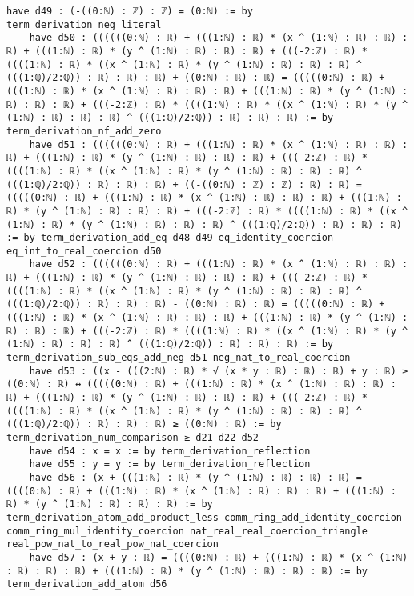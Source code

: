 \documentclass{article}
\begin{document}
\begin{tcolorbox}[colback=white!10, width=\linewidth]
\begin{lstlisting}[language=Lean4]
    have d49 : (-((0:ℕ) : ℤ) : ℤ) = (0:ℕ) := by term_derivation_neg_literal
    have d50 : ((((((0:ℕ) : ℝ) + (((1:ℕ) : ℝ) * (x ^ (1:ℕ) : ℝ) : ℝ) : ℝ) + (((1:ℕ) : ℝ) * (y ^ (1:ℕ) : ℝ) : ℝ) : ℝ) + (((-2:ℤ) : ℝ) * ((((1:ℕ) : ℝ) * ((x ^ (1:ℕ) : ℝ) * (y ^ (1:ℕ) : ℝ) : ℝ) : ℝ) ^ (((1:ℚ)/2:ℚ)) : ℝ) : ℝ) : ℝ) + ((0:ℕ) : ℝ) : ℝ) = (((((0:ℕ) : ℝ) + (((1:ℕ) : ℝ) * (x ^ (1:ℕ) : ℝ) : ℝ) : ℝ) + (((1:ℕ) : ℝ) * (y ^ (1:ℕ) : ℝ) : ℝ) : ℝ) + (((-2:ℤ) : ℝ) * ((((1:ℕ) : ℝ) * ((x ^ (1:ℕ) : ℝ) * (y ^ (1:ℕ) : ℝ) : ℝ) : ℝ) ^ (((1:ℚ)/2:ℚ)) : ℝ) : ℝ) : ℝ) := by term_derivation_nf_add_zero
    have d51 : ((((((0:ℕ) : ℝ) + (((1:ℕ) : ℝ) * (x ^ (1:ℕ) : ℝ) : ℝ) : ℝ) + (((1:ℕ) : ℝ) * (y ^ (1:ℕ) : ℝ) : ℝ) : ℝ) + (((-2:ℤ) : ℝ) * ((((1:ℕ) : ℝ) * ((x ^ (1:ℕ) : ℝ) * (y ^ (1:ℕ) : ℝ) : ℝ) : ℝ) ^ (((1:ℚ)/2:ℚ)) : ℝ) : ℝ) : ℝ) + ((-((0:ℕ) : ℤ) : ℤ) : ℝ) : ℝ) = (((((0:ℕ) : ℝ) + (((1:ℕ) : ℝ) * (x ^ (1:ℕ) : ℝ) : ℝ) : ℝ) + (((1:ℕ) : ℝ) * (y ^ (1:ℕ) : ℝ) : ℝ) : ℝ) + (((-2:ℤ) : ℝ) * ((((1:ℕ) : ℝ) * ((x ^ (1:ℕ) : ℝ) * (y ^ (1:ℕ) : ℝ) : ℝ) : ℝ) ^ (((1:ℚ)/2:ℚ)) : ℝ) : ℝ) : ℝ) := by term_derivation_add_eq d48 d49 eq_identity_coercion eq_int_to_real_coercion d50
    have d52 : ((((((0:ℕ) : ℝ) + (((1:ℕ) : ℝ) * (x ^ (1:ℕ) : ℝ) : ℝ) : ℝ) + (((1:ℕ) : ℝ) * (y ^ (1:ℕ) : ℝ) : ℝ) : ℝ) + (((-2:ℤ) : ℝ) * ((((1:ℕ) : ℝ) * ((x ^ (1:ℕ) : ℝ) * (y ^ (1:ℕ) : ℝ) : ℝ) : ℝ) ^ (((1:ℚ)/2:ℚ)) : ℝ) : ℝ) : ℝ) - ((0:ℕ) : ℝ) : ℝ) = (((((0:ℕ) : ℝ) + (((1:ℕ) : ℝ) * (x ^ (1:ℕ) : ℝ) : ℝ) : ℝ) + (((1:ℕ) : ℝ) * (y ^ (1:ℕ) : ℝ) : ℝ) : ℝ) + (((-2:ℤ) : ℝ) * ((((1:ℕ) : ℝ) * ((x ^ (1:ℕ) : ℝ) * (y ^ (1:ℕ) : ℝ) : ℝ) : ℝ) ^ (((1:ℚ)/2:ℚ)) : ℝ) : ℝ) : ℝ) := by term_derivation_sub_eqs_add_neg d51 neg_nat_to_real_coercion
    have d53 : ((x - (((2:ℕ) : ℝ) * √ (x * y : ℝ) : ℝ) : ℝ) + y : ℝ) ≥ ((0:ℕ) : ℝ) ↔ (((((0:ℕ) : ℝ) + (((1:ℕ) : ℝ) * (x ^ (1:ℕ) : ℝ) : ℝ) : ℝ) + (((1:ℕ) : ℝ) * (y ^ (1:ℕ) : ℝ) : ℝ) : ℝ) + (((-2:ℤ) : ℝ) * ((((1:ℕ) : ℝ) * ((x ^ (1:ℕ) : ℝ) * (y ^ (1:ℕ) : ℝ) : ℝ) : ℝ) ^ (((1:ℚ)/2:ℚ)) : ℝ) : ℝ) : ℝ) ≥ ((0:ℕ) : ℝ) := by term_derivation_num_comparison ≥ d21 d22 d52
    have d54 : x = x := by term_derivation_reflection
    have d55 : y = y := by term_derivation_reflection
    have d56 : (x + (((1:ℕ) : ℝ) * (y ^ (1:ℕ) : ℝ) : ℝ) : ℝ) = ((((0:ℕ) : ℝ) + (((1:ℕ) : ℝ) * (x ^ (1:ℕ) : ℝ) : ℝ) : ℝ) + (((1:ℕ) : ℝ) * (y ^ (1:ℕ) : ℝ) : ℝ) : ℝ) := by term_derivation_atom_add_product_less comm_ring_add_identity_coercion comm_ring_mul_identity_coercion nat_real_real_coercion_triangle real_pow_nat_to_real_pow_nat_coercion
    have d57 : (x + y : ℝ) = ((((0:ℕ) : ℝ) + (((1:ℕ) : ℝ) * (x ^ (1:ℕ) : ℝ) : ℝ) : ℝ) + (((1:ℕ) : ℝ) * (y ^ (1:ℕ) : ℝ) : ℝ) : ℝ) := by term_derivation_add_atom d56

\end{lstlisting}
\end{tcolorbox}
\end{document}
